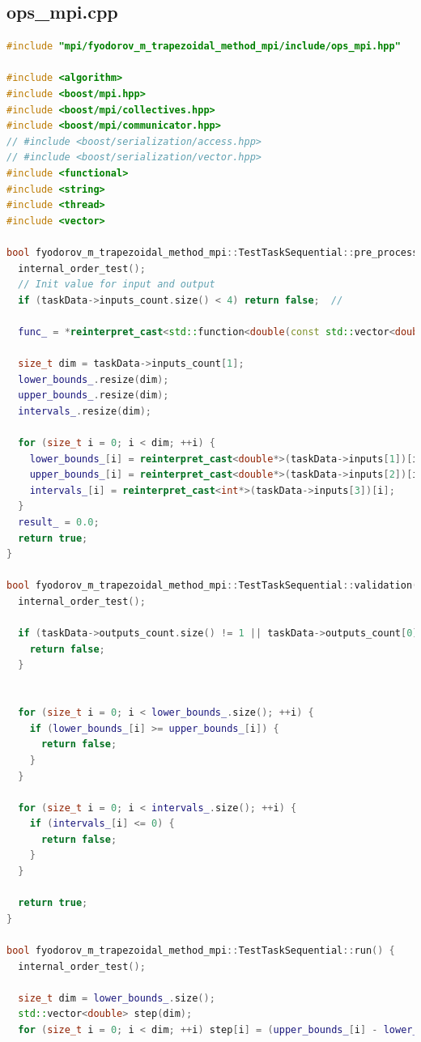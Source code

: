 \documentclass{article}
\begin{document}
\subsection{ops\_mpi.cpp}
\begin{lstlisting}[language=C++]
#include "mpi/fyodorov_m_trapezoidal_method_mpi/include/ops_mpi.hpp"

#include <algorithm>
#include <boost/mpi.hpp>
#include <boost/mpi/collectives.hpp>
#include <boost/mpi/communicator.hpp>
// #include <boost/serialization/access.hpp>
// #include <boost/serialization/vector.hpp>
#include <functional>
#include <string>
#include <thread>
#include <vector>

bool fyodorov_m_trapezoidal_method_mpi::TestTaskSequential::pre_processing() {
  internal_order_test();
  // Init value for input and output
  if (taskData->inputs_count.size() < 4) return false;  //

  func_ = *reinterpret_cast<std::function<double(const std::vector<double>&)>*>(taskData->inputs[0]);

  size_t dim = taskData->inputs_count[1];
  lower_bounds_.resize(dim);
  upper_bounds_.resize(dim);
  intervals_.resize(dim);

  for (size_t i = 0; i < dim; ++i) {
    lower_bounds_[i] = reinterpret_cast<double*>(taskData->inputs[1])[i];
    upper_bounds_[i] = reinterpret_cast<double*>(taskData->inputs[2])[i];
    intervals_[i] = reinterpret_cast<int*>(taskData->inputs[3])[i];
  }
  result_ = 0.0;
  return true;
}

bool fyodorov_m_trapezoidal_method_mpi::TestTaskSequential::validation() {
  internal_order_test();

  if (taskData->outputs_count.size() != 1 || taskData->outputs_count[0] != 1) {
    return false;
  }

  
  for (size_t i = 0; i < lower_bounds_.size(); ++i) {
    if (lower_bounds_[i] >= upper_bounds_[i]) {
      return false;
    }
  }

  for (size_t i = 0; i < intervals_.size(); ++i) {
    if (intervals_[i] <= 0) {
      return false;
    }
  }

  return true;
}

bool fyodorov_m_trapezoidal_method_mpi::TestTaskSequential::run() {
  internal_order_test();

  size_t dim = lower_bounds_.size();
  std::vector<double> step(dim);
  for (size_t i = 0; i < dim; ++i) step[i] = (upper_bounds_[i] - lower_bounds_[i]) / intervals_[i];


\end{lstlisting}
\end{document}
